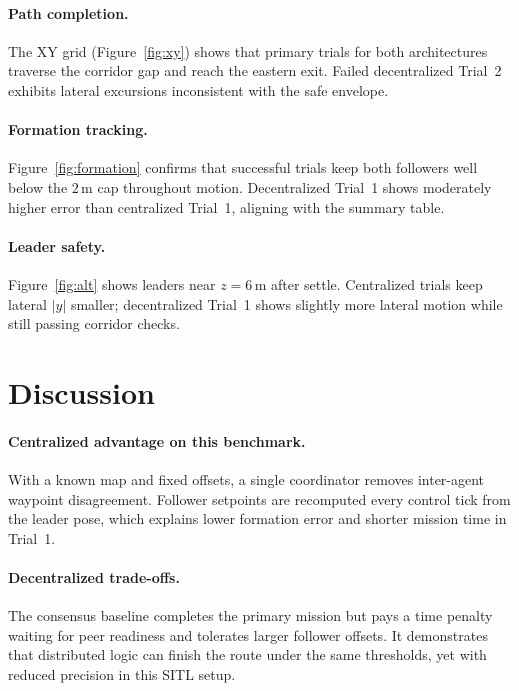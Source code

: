 \documentclass[a4paper,11pt]{article}
\begin{document}
\paragraph{Path completion.}
The XY grid (Figure~\ref{fig:xy}) shows that primary trials for both architectures traverse the corridor gap and reach the eastern exit. Failed decentralized Trial~2 exhibits lateral excursions inconsistent with the safe envelope.

\paragraph{Formation tracking.}
Figure~\ref{fig:formation} confirms that successful trials keep both followers well below the $2\,\mathrm{m}$ cap throughout motion. Decentralized Trial~1 shows moderately higher error than centralized Trial~1, aligning with the summary table.

\paragraph{Leader safety.}
Figure~\ref{fig:alt} shows leaders near $z=6\,\mathrm{m}$ after settle. Centralized trials keep lateral $|y|$ smaller; decentralized Trial~1 shows slightly more lateral motion while still passing corridor checks.

\FloatBarrier
\section{Discussion}

\paragraph{Centralized advantage on this benchmark.}
With a known map and fixed offsets, a single coordinator removes inter-agent waypoint disagreement. Follower setpoints are recomputed every control tick from the leader pose, which explains lower formation error and shorter mission time in Trial~1.

\paragraph{Decentralized trade-offs.}
The consensus baseline completes the primary mission but pays a time penalty waiting for peer readiness and tolerates larger follower offsets. It demonstrates that distributed logic can finish the route under the same thresholds, yet with reduced precision in this SITL setup.
\end{document}
